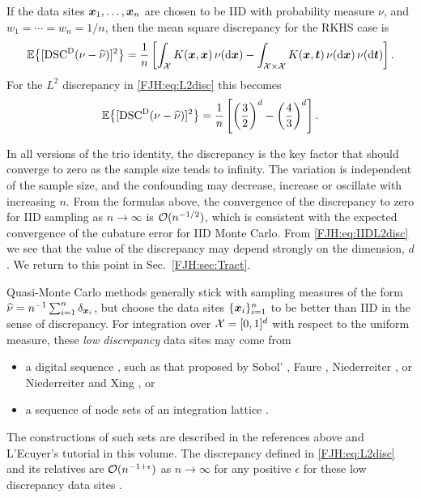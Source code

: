 \documentclass[graybox,footinfo]{svmult}
\begin{document}
If the data sites  ${\boldsymbol{x}}_{1}, \ldots, {\boldsymbol{x}}_{n}$ are chosen to be IID with probability measure 
$\nu$, and $w_1 = \cdots = w_n = 1/n$, then 
the mean square discrepancy for 
the RKHS case is
\begin{equation*}
{\mathbb{E}} \bigl\{[\textup{DSC}^{\textup{D}}(\nu - \widehat{\nu})]^2 \bigr \}  = \frac 1 n \left [ \int_{{\mathcal{X}}} K({\boldsymbol{x}},{\boldsymbol{x}}) \, 
\nu(\mathrm{d} 
{\boldsymbol{x}}) - 
\int_{{\mathcal{X}} \times {\mathcal{X}}} K({\boldsymbol{x}},{\boldsymbol{t}}) \, \nu(\mathrm{d} {\boldsymbol{x}}) \, \nu (\mathrm{d} {\boldsymbol{t}}) \right ].
\end{equation*}
For the $L^2$ discrepancy in \eqref{FJH:eq:L2disc} this becomes 
\begin{equation} \label{FJH:eq:IIDL2disc}
\bbE \bigl\{[\disc^{\Dt}(\nu - \hnu)]^2 \bigr \} = \frac 1 n \left [ \left(\frac 32\right)^d - 
\left(\frac 43\right)^d \right ].
\end{equation}

In all versions of the trio identity, the discrepancy is the key factor that should converge 
to 
zero as the sample size tends to infinity.  The variation is independent of the sample 
size, and the confounding may decrease, increase or oscillate with increasing $n$.  From 
the formulas above, the convergence of the discrepancy to zero for IID sampling as $n 
\to 
\infty$ is  ${\mathcal{O}}(n^{-1/2})$, which is consistent with the expected convergence of the 
cubature error for IID Monte Carlo.  From \eqref{FJH:eq:IIDL2disc} we see that the 
value of the discrepancy may depend strongly on the dimension, $d$.  We return 
to this point in Sec.\  \ref{FJH:sec:Tract}.

Quasi-Monte Carlo methods generally stick with sampling measures of the form  $\widehat{\nu} = 
n^{-1}\sum_{i=1}^n \delta_{{\boldsymbol{x}}_i}$, but choose the data sites $\{{\boldsymbol{x}}_i\}_{i=1}^n$ to be 
better than IID in the sense of discrepancy.  For 
integration over ${\mathcal{X}} = [0,1]^d$ with 
respect to the uniform measure, these \emph{low discrepancy} data sites may come from
\begin{itemize} 
\item a digital sequence \cite{DicPil10a}, such as that proposed by Sobol' \cite{Sob67}, 
Faure \cite{Fau82}, Niederreiter \cite{Nie88}, or Niederreiter and Xing \cite{NieXin96}, or 
\item a sequence of node sets of an integration lattice \cite{SloJoe94}.  
\end{itemize}
The 
constructions of such sets are described in the references above and L'Ecuyer's 
tutorial in this volume.  The discrepancy defined in \eqref{FJH:eq:L2disc} and its relatives 
are 
${\mathcal{O}}(n^{-1+\epsilon})$ as $n \to \infty$ for any positive $\epsilon$ for these low 
discrepancy data sites \cite{Nie92}.  
\end{document}
